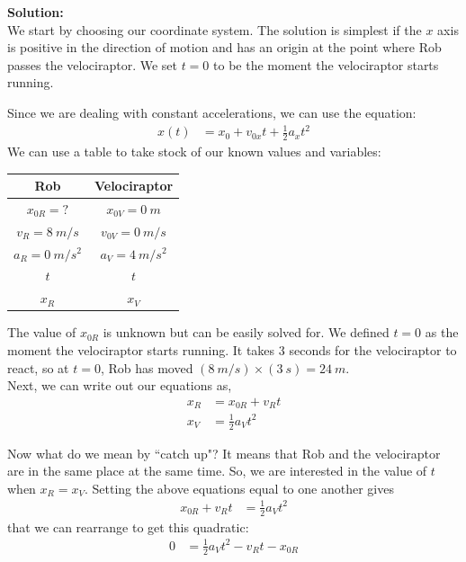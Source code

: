 \textbf{Solution:}\\
We start by choosing our coordinate system. The solution is simplest if the $x$ axis is positive in the direction of motion and has an origin at the point where Rob passes the velociraptor. We set $t=0$ to be the moment the velociraptor starts running.\\


Since we are dealing with constant accelerations, we can use the equation:
\begin{align*}
x(t)&=x_0+v_{0x}t+\frac{1}{2}a_xt^2
\end{align*}
We can use a table to take stock of our known values and variables:
\begin{table}[H]
\centering
\label{KnownsUnknownsSampleProb1D}
\begin{tabular}{|c|c|}
\hline
\textbf{Rob}          & \textbf{Velociraptor}  \\ \hline
$x_{0R} = ?$          & $x_{0V} = \SI{0}{m}$   \\
$v_R = \SI{8}{m/s}$   & $v_{0V} = \SI{0}{m/s}$ \\
$a_R = \SI{0}{m/s^2}$ & $a_V = \SI{4}{m/s^2}$  \\
$t$                   & $t$                    \\
$x_R$                 & $x_V$                 
\end{tabular}
\end{table}

The value of $x_{0R}$ is unknown but can be easily solved for. We defined $t=0$ as the moment the velociraptor starts running. It takes 3 seconds for the velociraptor to react, so at $t=0$, Rob has moved $(\SI{8}{m/s})\times (\SI{3}{s}) = \SI{24}{m}$.\\

Next, we can write out our equations as,
\begin{align*}
x_R&=x_{0R}+v_{R}t\\
x_V&=\frac{1}{2}a_Vt^2
\end{align*}
 
Now what do we mean by ``catch up"? It means that Rob and the velociraptor are in the same place at the same time. So, we are interested in the value of $t$ when $x_R=x_V$. Setting the above equations equal to one another gives
\begin{align*}
x_{0R}+v_{R}t&=\frac{1}{2}a_Vt^2 
\end{align*}
that we can rearrange to get this quadratic:
\begin{align*}
0&=\frac{1}{2}a_Vt^2-v_{R}t-x_{0R} 
\end{align*}


